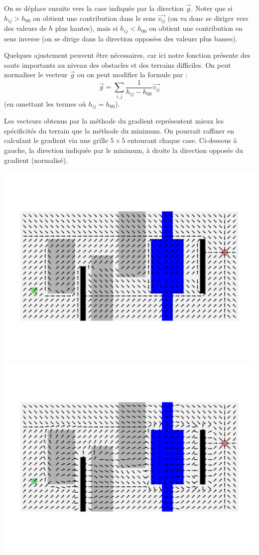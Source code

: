 \documentclass[11pt,class=report,crop=false]{standalone}
\begin{document}
On se déplace ensuite vers la case indiquée par la direction $\vec g$.
Noter que si $h_{ij}> h_{00}$ on obtient une contribution dans le sens $\vec{v_{ij}}$ (on va donc se diriger vers des valeurs de $h$ plus hautes),  mais si $h_{ij} < h_{00}$ on obtient une contribution en sens inverse (on se dirige dans la direction opposées des valeurs plus basses).

Quelques ajustement peuvent être nécessaires, car ici notre fonction présente des sauts importants au niveau des obstacles et des terrains difficiles. On peut normaliser le vecteur $\vec g$ ou on peut modifier la formule par :
$$\vec{g} = \sum_{i,j}  \frac{1}{h_{ij} - h_{00}} \vec{v_{ij}}$$
(en omettant les termes où $h_{ij} = h_{00}$).

Les vecteurs obtenus par la méthode du gradient représentent mieux les spécificités du terrain que la méthode du minimum. On pourrait raffiner en calculant le gradient via une grille $5\times 5$ entourant chaque case. 
Ci-dessous à gauche, la direction indiquée par le minimum, à droite la direction opposée du gradient (normalisé).
\begin{center}
	\includegraphics[scale=\myscale,scale=0.55,trim={1cm 2cm 0.5cm 2cm},clip]{figures/terrain-02-3}
	\includegraphics[scale=\myscale,scale=0.55,trim={0.5cm 2cm 1cm 2cm},clip]{figures/terrain-02-4}
\end{center}
\end{document}
